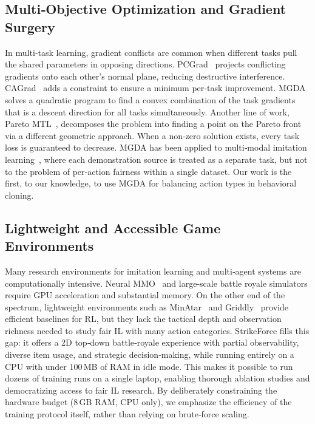\documentclass[conference]{IEEEtran}
\begin{document}
\subsection{Multi‑Objective Optimization and Gradient Surgery}
In multi‑task learning, gradient conflicts are common when different tasks pull the shared parameters in opposing directions. PCGrad~\cite{yu2020gradient} projects conflicting gradients onto each other’s normal plane, reducing destructive interference. CAGrad~\cite{liu2021conflict} adds a constraint to ensure a minimum per‑task improvement. MGDA~\cite{desideri2012multiple,sener2018multi} solves a quadratic program to find a convex combination of the task gradients that is a descent direction for all tasks simultaneously. Another line of work, Pareto MTL~\cite{lin2019pareto}, decomposes the problem into finding a point on the Pareto front via a different geometric approach. %
When a non‑zero solution exists, every task loss is guaranteed to decrease. MGDA has been applied to multi‑modal imitation learning~\cite{peng2019multi}, where each demonstration source is treated as a separate task, but not to the problem of per‑action fairness within a single dataset. Our work is the first, to our knowledge, to use MGDA for balancing action types in behavioral cloning.

\subsection{Lightweight and Accessible Game Environments}
Many research environments for imitation learning and multi‑agent systems are computationally intensive. Neural MMO~\cite{suarez2019neural} and large‑scale battle royale simulators require GPU acceleration and substantial memory. On the other end of the spectrum, lightweight environments such as MinAtar~\cite{young2019minatar} and Griddly~\cite{bamford2020griddly} provide efficient baselines for RL, but they lack the tactical depth and observation richness needed to study fair IL with many action categories. %
StrikeForce fills this gap: it offers a 2D top‑down battle‑royale experience with partial observability, diverse item usage, and strategic decision‑making, while running entirely on a CPU with under 100\,MB of RAM in idle mode. This makes it possible to run dozens of training runs on a single laptop, enabling thorough ablation studies and democratizing access to fair IL research. By deliberately constraining the hardware budget (8\,GB RAM, CPU only), we emphasize the efficiency of the training protocol itself, rather than relying on brute‑force scaling.
\end{document}
